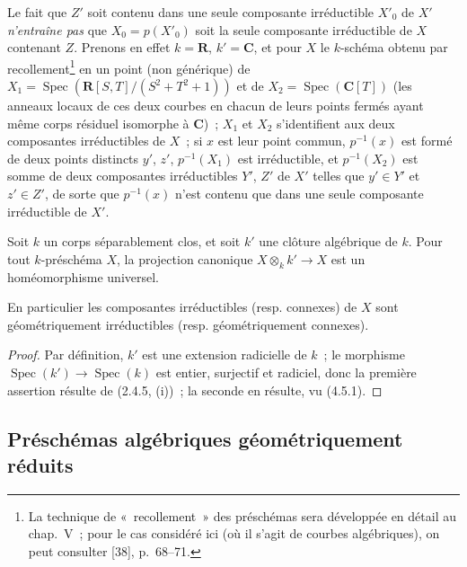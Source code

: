 \begin{remark}[4.5.20]
\label{IV.2.4.5.20-fr}
Le fait que $Z'$ soit contenu dans une seule composante irréductible $X'_0$ de
$X'$ \emph{n'entraîne pas} que $X_0=p(X'_0)$ soit la seule composante
irréductible de $X$ contenant $Z$. Prenons en effet $k=\mathbf R$,
$k'=\mathbf C$, et pour $X$ le $k$-schéma obtenu par recollement\footnote{La
technique de «~recollement~» des préschémas sera développée en détail au
chap.~V~; pour le cas considéré ici (où il s'agit de courbes algébriques), on
peut consulter [38], p.~68--71.} en un point (non générique) de
$X_1=\operatorname{Spec}(\mathbf R[S,T]/(S^2+T^2+1))$ et de
$X_2=\operatorname{Spec}(\mathbf C[T])$ (les anneaux locaux de ces deux courbes
en chacun de leurs points fermés ayant même corps résiduel isomorphe à
$\mathbf C$)~; $X_1$ et $X_2$ s'identifient aux deux composantes irréductibles
de $X$~; si $x$ est leur point commun, $p^{-1}(x)$ est formé de deux points
distincts $y'$, $z'$, $p^{-1}(X_1)$ est irréductible, et $p^{-1}(X_2)$ est somme
de deux composantes irréductibles $Y'$, $Z'$ de $X'$ telles que $y'\in Y'$ et
$z'\in Z'$, de sorte que $p^{-1}(x)$ n'est contenu que dans une seule
composante irréductible de $X'$.
\end{remark}

\begin{proposition}[4.5.21]
\label{IV.2.4.5.21-fr}
Soit $k$ un corps séparablement clos, et soit $k'$ une clôture algébrique de
$k$. Pour tout $k$-préschéma $X$, la projection canonique
$X\otimes_k k'\to X$ est un homéomorphisme universel.


En particulier les composantes irréductibles (resp. connexes) de $X$ sont
géométriquement irréductibles (resp. géométriquement connexes).
\end{proposition}

\begin{proof}
Par définition, $k'$ est une extension radicielle de $k$~; le morphisme
$\operatorname{Spec}(k')\to\operatorname{Spec}(k)$ est entier, surjectif et
radiciel, donc la première assertion résulte de (2.4.5, (i))~; la seconde en
résulte, vu (4.5.1).
\end{proof}

\subsection{Préschémas algébriques géométriquement réduits}
\label{subsection:IV.2.4.6-fr}

